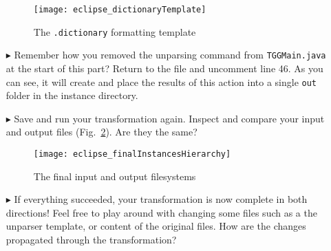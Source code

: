 \begin{itemize}
\vspace{0.5cm}

\begin{figure}[htpb]
\begin{center}
  \texttt{[image: eclipse\_dictionaryTemplate]}
  \caption{The \texttt{.dictionary} formatting template}
  \label{eclipse:dictionaryTemplate}
\end{center}
\end{figure}

\item[$\blacktriangleright$] Remember how you removed the unparsing command from \texttt{TGGMain.java} at the start of this part? Return to the file and
uncomment line 46.  As you can see, it will create and place the results of this action into a single \texttt{out} folder in the instance directory. 

\item[$\blacktriangleright$] Save and run your transformation again. Inspect and compare your input and output files (Fig.~\ref{eclipse:unparseResult}). Are
they the same?

\vspace{0.5cm}

\begin{figure}[htpb]
\begin{center}
  \texttt{[image: eclipse\_finalInstancesHierarchy]}
  \caption{The final input and output filesystems}
  \label{eclipse:unparseResult}
\end{center}
\end{figure}

\item[$\blacktriangleright$] If everything succeeded, your transformation is now complete in both directions! Feel free to play around with
changing some files such as a the unparser template, or content of the original files. How are the changes propagated through the transformation?

\end{itemize}